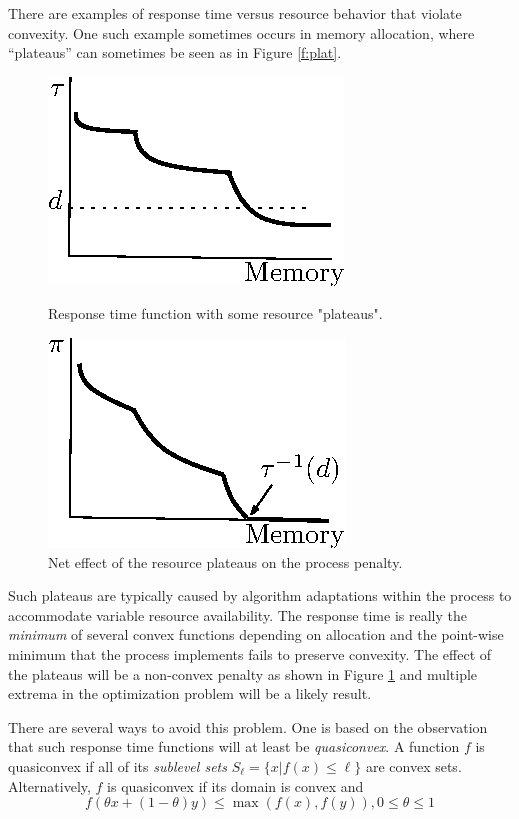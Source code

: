 There are examples of response time versus resource behavior that violate convexity.  One such example sometimes occurs in memory allocation, where “plateaus” can sometimes be seen as in Figure \ref{f:plat}.
\begin{figure}[b]
\parbox{1.6in}{
\includegraphics*{Plateau1.eps}
\caption{\label{f:plat}Response time function with some resource "plateaus".}
}  
\hspace{\fill}
\parbox{1.6in}{
\includegraphics*{Plateau2.eps}
\caption{\label{f:plateffect}Net effect of the resource plateaus on the process penalty.}
}
\end{figure}
Such plateaus are typically caused by algorithm adaptations within the process to accommodate variable resource availability.  The response time is really the \emph{minimum} of several convex functions depending on allocation and the point-wise minimum that the process implements fails to preserve convexity.  The effect of the plateaus will be a non-convex penalty as shown in Figure \ref{f:plateffect} and multiple extrema in the optimization problem will be a likely result.

There are several ways to avoid this problem.  One is based on the observation that such response time functions
will at least be \emph{quasiconvex}.  A function $f$ is quasiconvex if all of its \emph{sublevel sets}
$S_\ell = \{x | f(x) \leq \ell\}$ are convex sets.
Alternatively, $f$ is quasiconvex if its domain is convex and
\begin{displaymath}
f(\theta x + (1-\theta)y) \leq \max(f(x),f(y)), 0 \leq \theta \leq 1
\end{displaymath}


